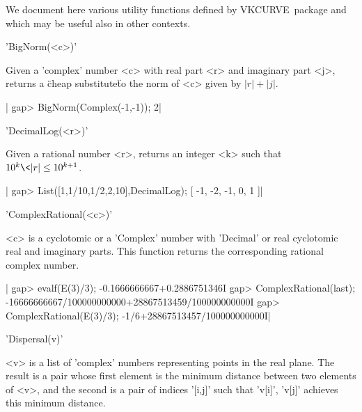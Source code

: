 \def\VKCURVE{{\sf VKCURVE}}
\def\CHEVIE{{\sf CHEVIE}}

We document here various utility functions defined by \VKCURVE\ package
and which may be useful also in other contexts.


'BigNorm(<c>)'

Given a 'complex' number <c> with  real part <r> and imaginary part <j>,
returns a \"cheap substitute\" to the norm of <c> given by $|r|+|j|$.

|    gap> BigNorm(Complex(-1,-1));
    2|


'DecimalLog(<r>)'

Given a rational  number <r>, returns an integer <k>  such that $10^k\<
|r| \le 10^{k+1}$.

|    gap> List([1,1/10,1/2,2,10],DecimalLog);
    [ -1, -2, -1, 0, 1 ]|


'ComplexRational(<c>)'

<c> is a cyclotomic or a 'Complex' number with 'Decimal' or real cyclotomic
real  and imaginary parts. This function returns the corresponding rational
complex number.

|    gap> evalf(E(3)/3);
    -0.1666666667+0.2886751346I
    gap> ComplexRational(last);
    -16666666667/100000000000+28867513459/100000000000I
    gap> ComplexRational(E(3)/3);
    -1/6+28867513457/100000000000I|


'Dispersal(v)'

<v> is a list of 'complex' numbers representing points in the real plane.
The result is a pair whose first element is the minimum distance between
two elements of <v>, and the second is a pair of indices '[i,j]' such that
'v[i]', 'v[j]' achieves this minimum distance.

